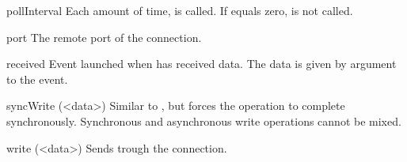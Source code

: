 \begin{urbiscriptapi}
\item[pollInterval] Each  amount of time,
   is called. If  equals zero,
   is not called.


\item[port]
  The remote port of the connection.


\item[received]
  Event launched when \this has received data. The data is
  given by argument to the event.


\item[syncWrite](<data>)%
  Similar to , but forces the operation to complete
  synchronously. Synchronous and asynchronous write operations cannot be
  mixed.


\item[write](<data>)%
  Sends  trough the connection.
\end{urbiscriptapi}

